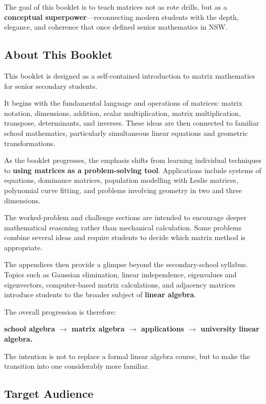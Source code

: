 \documentclass[12pt]{article}
\begin{document}
The goal of this booklet is to teach matrices not as rote drills, but as a \textbf{conceptual superpower}---reconnecting modern students with the depth, elegance, and coherence that once defined senior mathematics in NSW.

\subsection{About This Booklet}

This booklet is designed as a self-contained introduction to matrix mathematics for senior secondary students.

It begins with the fundamental language and operations of matrices: matrix notation, dimensions, addition, scalar multiplication, matrix multiplication, transpose, determinants, and inverses. These ideas are then connected to familiar school mathematics, particularly simultaneous linear equations and geometric transformations.

As the booklet progresses, the emphasis shifts from learning individual techniques to \textbf{using matrices as a problem-solving tool}. Applications include systems of equations, dominance matrices, population modelling with Leslie matrices, polynomial curve fitting, and problems involving geometry in two and three dimensions.

The worked-problem and challenge sections are intended to encourage deeper mathematical reasoning rather than mechanical calculation. Some problems combine several ideas and require students to decide which matrix method is appropriate.

The appendices then provide a glimpse beyond the secondary-school syllabus. Topics such as Gaussian elimination, linear independence, eigenvalues and eigenvectors, computer-based matrix calculations, and adjacency matrices introduce students to the broader subject of \textbf{linear algebra}.

The overall progression is therefore:

\textbf{school algebra $\rightarrow$ matrix algebra $\rightarrow$ applications $\rightarrow$ university linear algebra.}

The intention is not to replace a formal linear algebra course, but to make the transition into one considerably more familiar.

\subsection{Target Audience}
\end{document}
